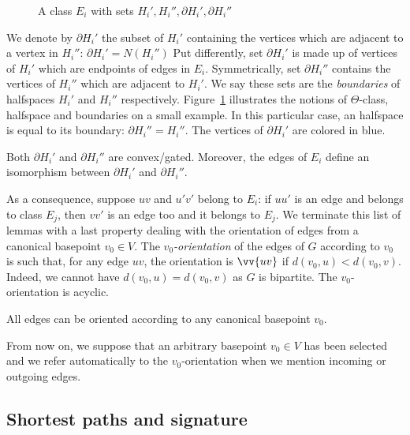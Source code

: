 \documentclass[a4paper,UKenglish,numberwithinsect,cleveref, autoref,anonymous]{lipics-v2021}
\begin{document}
\begin{figure}[h]
\centering
\scalebox{0.7}{}
\caption{A class $E_i$ with sets $H_i', H_i'', \partial H_i', \partial H_i''$}
\label{fig:halfspaces}
\end{figure}

We denote by $\partial H_i'$ the subset of $H_i'$ containing the vertices which are adjacent to a vertex in $H_i''$: $\partial H_i' = N(H_i'')$ Put differently, set $\partial H_i'$ is made up of vertices of $H_i'$ which are endpoints of edges in $E_i$. Symmetrically, set $\partial H_i''$ contains the vertices of $H_i''$ which are adjacent to $H_i'$. We say these sets are the \textit{boundaries} of halfspaces $H_i'$ and $H_i''$ respectively. Figure~\ref{fig:halfspaces} illustrates the notions of $\Theta$-class, halfspace and boundaries on a small example. In this particular case, an halfspace is equal to its boundary: $\partial H_i'' = H_i''$. The vertices of $\partial H_i'$ are colored in blue.

\begin{lemma}
Both $\partial H_i'$ and $\partial H_i''$ are convex/gated. Moreover, the edges of $E_i$ define an isomorphism between $\partial H_i'$ and $\partial H_i''$.
\label{le:boundaries}
\end{lemma}


As a consequence, suppose $uv$ and $u'v'$ belong to $E_i$: if $uu'$ is an edge and belongs to class $E_j$, then $vv'$ is an edge too and it belongs to $E_j$. We terminate this list of lemmas with a last property dealing with the orientation of edges  from a canonical basepoint $v_0 \in V$. The \textit{$v_0$-orientation} of the edges of $G$ according to $v_0$ is such that, for any edge $uv$, the orientation is $\vv{uv}$ if $d(v_0,u) < d(v_0,v)$. Indeed, we cannot have $d(v_0,u) = d(v_0,v)$ as $G$ is bipartite. The $v_0$-orientation is acyclic.

\begin{lemma}
All edges can be oriented according to any canonical basepoint $v_0$.
\end{lemma}

From now on, we suppose that an arbitrary basepoint $v_0 \in V$ has been selected and we refer automatically to the $v_0$-orientation when we mention incoming or outgoing edges.

\subsection{Shortest paths and signature} \label{subsec:signature}
\end{document}
